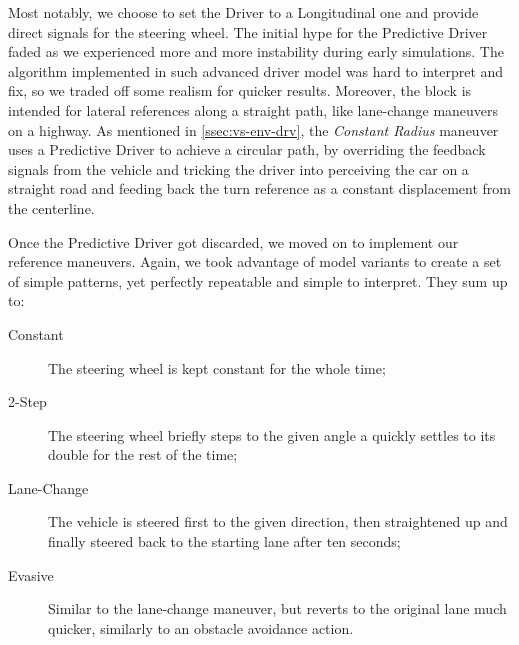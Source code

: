		Most notably, we choose to set the Driver to a Longitudinal one and provide direct signals for the steering wheel. The initial hype for the Predictive Driver faded as
		we experienced more and more instability during early simulations. The algorithm implemented in such advanced driver model was hard to interpret and fix, so we traded
		off some realism for quicker results. Moreover, the block is intended for lateral references along a straight path, like lane-change maneuvers on a highway.
		As mentioned in \vref{ssec:vs-env-drv}, the \emph{Constant Radius} maneuver uses a Predictive Driver to achieve a circular path, by overriding the feedback signals
		from the vehicle and tricking the driver into perceiving the car on a straight road and feeding back the turn reference as a constant displacement from the centerline.

		Once the Predictive Driver got discarded, we moved on to implement our reference maneuvers. Again, we took advantage of \mwSL{} model variants to create a set of
		simple patterns, yet perfectly repeatable and simple to interpret. They sum up to:
		\begin{description}

			\item[Constant] The steering wheel is kept constant for the whole time;

			\item[2-Step] The steering wheel briefly steps to the given angle a quickly settles to its double for the rest of the time;

			\item[Lane-Change] The vehicle is steered first to the given direction, then straightened up and finally steered back to the starting lane after ten seconds;

			\item[Evasive] Similar to the lane-change maneuver, but reverts to the original lane much quicker, similarly to an obstacle avoidance action.

		\end{description}
		
